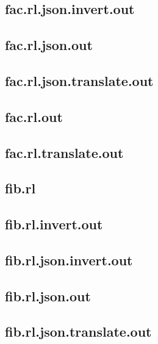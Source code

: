 \subsection{fac.rl.json.invert.out}
\label{app:fac_rl.json.invert.out}

\subsection{fac.rl.json.out}
\label{app:fac_rl.json.out}

\subsection{fac.rl.json.translate.out}
\label{app:fac_rl.json.translate.out}

\subsection{fac.rl.out}
\label{app:fac_rl.out}

\subsection{fac.rl.translate.out}
\label{app:fac_rl.translate.out}

\subsection{fib.rl}
\label{app:fib_rl}

\subsection{fib.rl.invert.out}
\label{app:fib_rl.invert.out}

\subsection{fib.rl.json.invert.out}
\label{app:fib_rl.json.invert.out}

\subsection{fib.rl.json.out}
\label{app:fib_rl.json.out}

\subsection{fib.rl.json.translate.out}
\label{app:fib_rl.json.translate.out}

